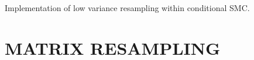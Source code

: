 \documentclass{article}
\begin{document}
\subsection*{\cite{lee2019}}
Implementation of low variance resampling within conditional SMC.


\subsection*{\cite{fox2003}}


\subsection*{\cite{gandy2016}}


\subsection*{\cite{whitley1994}}


\subsection*{\cite{carpenter1999}}


\subsection*{\cite{gerber2017}}


\subsection*{\cite{delmoral2012}}




%
\section*{MATRIX RESAMPLING}
\end{document}
